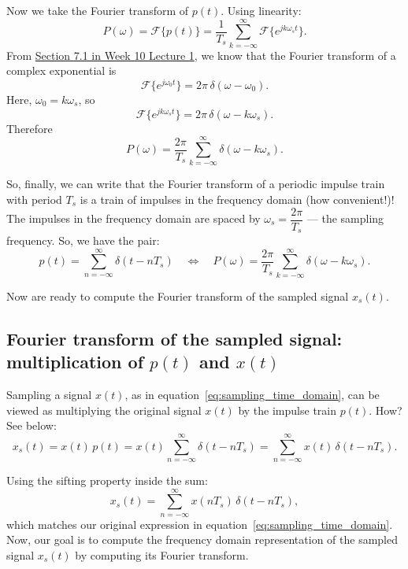 Now we take the Fourier transform of $p(t)$. Using linearity:
\[
P(\omega) = \mathcal{F}\{p(t)\}
= \frac{1}{T_s} \sum_{k=-\infty}^{\infty}
   \mathcal{F}\{e^{jk\omega_s t}\}.
\]
From \href{https://github.com/ee-ucmerced/ee102-signals-systems/blob/main/lecture_notes/week10_fourier_filtering/w10l1_fourier_filtering.pdf}{Section 7.1 in Week 10 Lecture 1}, we know that the Fourier transform of a complex exponential is
\[
\mathcal{F}\{e^{j\omega_0 t}\} = 2\pi\,\delta(\omega - \omega_0).
\]
Here, $\omega_0 = k\omega_s$, so
\[
\mathcal{F}\{e^{jk\omega_s t}\} = 2\pi\,\delta(\omega - k\omega_s).
\]
Therefore
\[
P(\omega)
= \frac{2\pi}{T_s} \sum_{k=-\infty}^{\infty} \delta(\omega - k\omega_s).
\]

So, finally, we can write that the Fourier transform of a periodic impulse train with period $T_s$ is a train
of impulses in the frequency domain (how convenient!)! The impulses in the frequency domain are spaced by $\omega_s = \dfrac{2\pi}{T_s}$ --- the sampling frequency. So, we have the pair:
\[
p(t) = \sum_{n=-\infty}^{\infty} \delta(t - nT_s)
\quad\Longleftrightarrow\quad
P(\omega) = \frac{2\pi}{T_s} \sum_{k=-\infty}^{\infty} \delta(\omega - k\omega_s).
\]

Now are ready to compute the Fourier transform of the sampled signal $x_s(t)$.
\subsection{Fourier transform of the sampled signal: multiplication of $p(t)$ and $x(t)$}

Sampling a signal $x(t)$, as in equation~\eqref{eq:sampling_time_domain}, can be viewed as multiplying the original signal $x(t)$ by the impulse train $p(t)$. How? See below:
\[
x_s(t) = x(t)\,p(t)
= x(t)\sum_{n=-\infty}^{\infty} \delta(t - nT_s)
= \sum_{n=-\infty}^{\infty} x(t)\,\delta(t - nT_s).
\]

Using the sifting property inside the sum:
\[
x_s(t) = \sum_{n=-\infty}^{\infty} x(nT_s)\,\delta(t - nT_s),
\]
which matches our original expression in equation~\eqref{eq:sampling_time_domain}. Now, our goal is to compute the frequency domain representation of the sampled signal $x_s(t)$ by computing its Fourier transform. 

